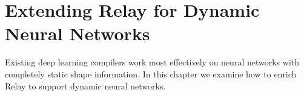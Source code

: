 \chapter{Extending Relay for Dynamic Neural Networks}
\label{ch:dynamic}

Existing deep learning compilers work most effectively on neural networks with completely static shape information. In this chapter we examine how to enrich Relay to support dynamic neural networks.
